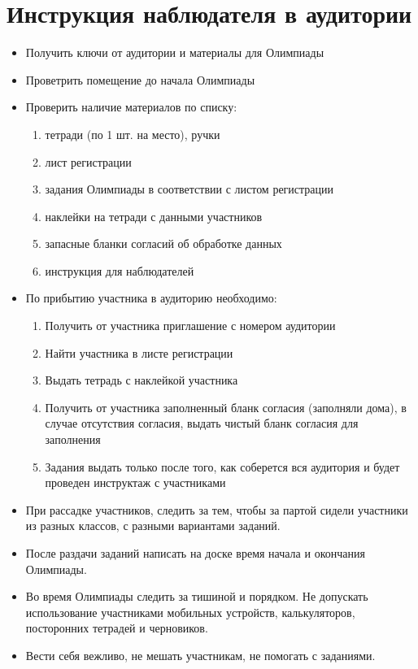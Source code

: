 \documentclass[a4paper,12pt]{article}
\begin{document}
\section{Инструкция наблюдателя в аудитории}

\begin{itemize} %
	\item Получить ключи от аудитории и материалы для Олимпиады
	\item Проветрить помещение до начала Олимпиады
	\item Проверить наличие материалов по списку: \begin{enumerate}
		\item тетради (по 1 шт. на место), ручки
		\item лист регистрации
		\item задания Олимпиады в соответствии с листом регистрации
		\item наклейки на тетради с данными участников
		\item запасные бланки согласий об обработке данных
		\item инструкция для наблюдателей
	\end{enumerate}
	\item По прибытию участника в аудиторию необходимо: \begin{enumerate}
		\item Получить от участника приглашение с номером аудитории
		\item Найти участника в листе регистрации
		\item Выдать тетрадь с наклейкой участника
		\item Получить от участника заполненный бланк согласия (заполняли дома), в случае отсутствия согласия, выдать чистый бланк согласия для заполнения
		\item Задания выдать только после того, как соберется вся аудитория и будет проведен инструктаж с участниками
	\end{enumerate}
	\item При рассадке участников, следить за тем, чтобы за партой сидели участники из разных классов, с разными вариантами заданий.
	\item После раздачи заданий написать на доске время начала и окончания Олимпиады.
	\item Во время Олимпиады следить за тишиной и порядком. Не допускать использование участниками мобильных устройств, калькуляторов, посторонних тетрадей и черновиков.
	\item Вести себя вежливо, не мешать участникам, не помогать с заданиями.

\end{itemize}
\end{document}
